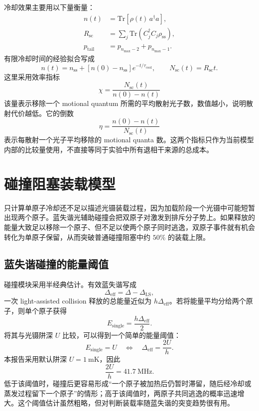 \documentclass[UTF8,a4paper,12pt]{ctexart}
\begin{document}
冷却效果主要用以下量衡量：
\begin{align}
n(t)&=\mathrm{Tr}[\rho(t)\,a^\dagger a],\\
R_{\mathrm{sc}}&=\sum_j\mathrm{Tr}(C_j^\dagger C_j\rho_{\mathrm{ss}}),\\
p_{\mathrm{tail}}&=p_{n_{\max}-2}+p_{n_{\max}-1}.
\end{align}
有限冷却时间的经验拟合写成
\begin{equation}
n(t)=n_{\mathrm{ss}}+\left[n(0)-n_{\mathrm{ss}}\right]e^{-t/\tau_{\mathrm{cool}}},
\qquad
N_{\mathrm{sc}}(t)=R_{\mathrm{sc}}t.
\label{eq:finite_time}
\end{equation}
这里采用效率指标
\begin{equation}
\chi=\frac{N_{\mathrm{sc}}(t)}{n(0)-n(t)}
\label{eq:chi}
\end{equation}
该量表示移除一个 motional quantum 所需的平均散射光子数，数值越小，说明散射代价越低。它的倒数
\begin{equation}
\eta=\frac{n(0)-n(t)}{N_{\mathrm{sc}}(t)}
\end{equation}
表示每散射一个光子平均移除的 motional quanta 数。这两个指标只作为当前模型内部的比较量使用，不直接等同于实验中所有退相干来源的总成本。

\section{碰撞阻塞装载模型}

只计算单原子冷却还不足以描述光镊装载过程，因为加载阶段一个光镊中可能短暂出现两个原子。蓝失谐光辅助碰撞会把双原子对激发到排斥分子势上。如果释放的能量大致足以移除一个原子、但不足以使两个原子同时逃逸，双原子事件就有机会转化为单原子保留，从而突破普通碰撞阻塞中约 $50\%$ 的装载上限\cite{carpentier2013,fung2015,brown2019}。

\subsection{蓝失谐碰撞的能量阈值}

碰撞模块采用半经典估计。有效蓝失谐写成
\[
\Delta_{\mathrm{eff}}=\Delta-\Delta_{\mathrm{LS}},
\]
一次 light-assisted collision 释放的总能量近似为 $h\Delta_{\mathrm{eff}}$。若将能量平均分给两个原子，则单个原子获得
\begin{equation}
E_{\mathrm{single}}=\frac{h\Delta_{\mathrm{eff}}}{2}.
\label{eq:single_energy}
\end{equation}
将其与光镊阱深 $U$ 比较，可以得到一个简单的能量阈值：
\begin{equation}
E_{\mathrm{single}}=U
\quad\Longleftrightarrow\quad
\Delta_{\mathrm{eff}}=\frac{2U}{h}.
\label{eq:loading_threshold}
\end{equation}
本报告采用默认阱深 $U=1~\mathrm{mK}$，因此
\[
\frac{2U}{h}=41.7~\mathrm{MHz}.
\]
低于该阈值时，碰撞后更容易形成“一个原子被加热后仍暂时滞留，随后经冷却或蒸发过程留下一个原子”的情形；高于该阈值时，两原子共同逃逸的概率迅速增大。这个阈值估计虽然粗略，但对判断装载率随蓝失谐的突变趋势很有用。
\end{document}
